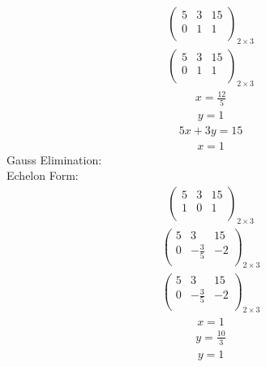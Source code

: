 \documentclass{article}
\begin{document}
\begin{align*}
\left(
\begin{array}{cc|c}
5 & 3 & 15\\
0 & 1 & 1\\
\end{array}
\right)_{2\times 3}
\end{align*}
\begin{align*}
\left(
\begin{array}{cc|c}
5 & 3 & 15\\
0 & 1 & 1\\
\end{array}
\right)_{2\times 3}
\end{align*}
\begin{align*}
x=\frac{12}{5}\end{align*}
\begin{align*}
y=1\end{align*}
\begin{align*}
5x + 3y=15\end{align*}
\begin{align*}
x=1\end{align*}
Gauss Elimination:\\
Echelon Form:\\
\begin{align*}
\left(
\begin{array}{cc|c}
5 & 3 & 15\\
1 & 0 & 1\\
\end{array}
\right)_{2\times 3}
\end{align*}
\begin{align*}
\left(
\begin{array}{cc|c}
5 & 3 & 15\\
0 & -\frac{3}{5} & -2\\
\end{array}
\right)_{2\times 3}
\end{align*}
\begin{align*}
\left(
\begin{array}{cc|c}
5 & 3 & 15\\
0 & -\frac{3}{5} & -2\\
\end{array}
\right)_{2\times 3}
\end{align*}
\begin{align*}
x=1\end{align*}
\begin{align*}
y=\frac{10}{3}\end{align*}
\begin{align*}
y=1\end{align*}
\end{document}
